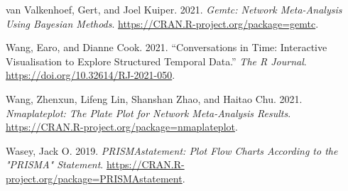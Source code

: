 \begin{CSLReferences}{1}{0}
\leavevmode{}%
van Valkenhoef, Gert, and Joel Kuiper. 2021. \emph{Gemtc: Network Meta-Analysis Using Bayesian Methods}. \url{https://CRAN.R-project.org/package=gemtc}.

\leavevmode{}%
Wang, Earo, and Dianne Cook. 2021. {``Conversations in Time: Interactive Visualisation to Explore Structured Temporal Data.''} \emph{The R Journal}. \url{https://doi.org/10.32614/RJ-2021-050}.

\leavevmode{}%
Wang, Zhenxun, Lifeng Lin, Shanshan Zhao, and Haitao Chu. 2021. \emph{Nmaplateplot: The Plate Plot for Network Meta-Analysis Results}. \url{https://CRAN.R-project.org/package=nmaplateplot}.

\leavevmode{}%
Wasey, Jack O. 2019. \emph{PRISMAstatement: Plot Flow Charts According to the "PRISMA" Statement}. \url{https://CRAN.R-project.org/package=PRISMAstatement}.

\end{CSLReferences}



\address{%
Loukia M. Spineli\\
Midwifery Research and Education Unit\\%
Hannover Medical School\\ Carl-Neuber-Strasse 1, 30625, Hannover, Germany\\
%
\url{https://www.github.com/LoukiaSpin}\\%
\textit{ORCiD: \href{https://orcid.org/0000-0001-9515-582X}{0000-0001-9515-582X}}\\%
\href{mailto:Spineli.Loukia@mh-hannover.de}{\nolinkurl{Spineli.Loukia@mh-hannover.de}}%
}

\address{%
Chrysostomos Kalyvas\\
Biostatistics and Research Decision Sciences\\%
MSD Europe Inc., Brussels, Belgium\\
%
\url{https://www.github.com/ckalyvas}\\%
\textit{ORCiD: \href{https://orcid.org/0000-0003-0606-4518}{0000-0003-0606-4518}}\\%
\href{mailto:chrysostomos.kalyvas@merck.com}{\nolinkurl{chrysostomos.kalyvas@merck.com}}%
}

\address{%
Katerina Papadimitropoulou\\
Health Economics and Market Access\\%
Amaris Consulting, Lyon, France\\
%
\url{https://www.github.com/Katerina-Pap}\\%
\textit{ORCiD: \href{https://orcid.org/0000-0002-5732-4044}{0000-0002-5732-4044}}\\%
\href{mailto:katerina.papadimitropoulou@gmail.com}{\nolinkurl{katerina.papadimitropoulou@gmail.com}}%
}

